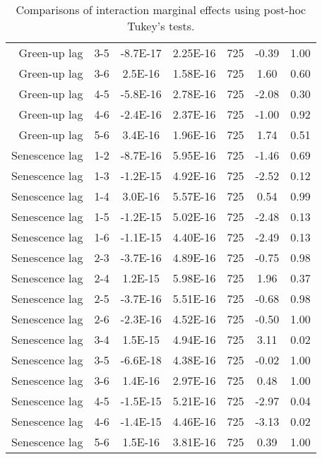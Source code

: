\begin{table}[H]
\begin{tabular}{rcccccc}
  Green-up lag & 3-5 & -8.7E-17 & 2.25E-16 & 725 & -0.39 & 1.00 \\ 
  Green-up lag & 3-6 & 2.5E-16 & 1.58E-16 & 725 & 1.60 & 0.60 \\ 
  Green-up lag & 4-5 & -5.8E-16 & 2.78E-16 & 725 & -2.08 & 0.30 \\ 
  Green-up lag & 4-6 & -2.4E-16 & 2.37E-16 & 725 & -1.00 & 0.92 \\ 
  Green-up lag & 5-6 & 3.4E-16 & 1.96E-16 & 725 & 1.74 & 0.51 \\ 
  Senescence lag & 1-2 & -8.7E-16 & 5.95E-16 & 725 & -1.46 & 0.69 \\ 
  Senescence lag & 1-3 & -1.2E-15 & 4.92E-16 & 725 & -2.52 & 0.12 \\ 
  Senescence lag & 1-4 & 3.0E-16 & 5.57E-16 & 725 & 0.54 & 0.99 \\ 
  Senescence lag & 1-5 & -1.2E-15 & 5.02E-16 & 725 & -2.48 & 0.13 \\ 
  Senescence lag & 1-6 & -1.1E-15 & 4.40E-16 & 725 & -2.49 & 0.13 \\ 
  Senescence lag & 2-3 & -3.7E-16 & 4.89E-16 & 725 & -0.75 & 0.98 \\ 
  Senescence lag & 2-4 & 1.2E-15 & 5.98E-16 & 725 & 1.96 & 0.37 \\ 
  Senescence lag & 2-5 & -3.7E-16 & 5.51E-16 & 725 & -0.68 & 0.98 \\ 
  Senescence lag & 2-6 & -2.3E-16 & 4.52E-16 & 725 & -0.50 & 1.00 \\ 
  Senescence lag & 3-4 & 1.5E-15 & 4.94E-16 & 725 & 3.11 & 0.02 \\ 
  Senescence lag & 3-5 & -6.6E-18 & 4.38E-16 & 725 & -0.02 & 1.00 \\ 
  Senescence lag & 3-6 & 1.4E-16 & 2.97E-16 & 725 & 0.48 & 1.00 \\ 
  Senescence lag & 4-5 & -1.5E-15 & 5.21E-16 & 725 & -2.97 & 0.04 \\ 
  Senescence lag & 4-6 & -1.4E-15 & 4.46E-16 & 725 & -3.13 & 0.02 \\ 
  Senescence lag & 5-6 & 1.5E-16 & 3.81E-16 & 725 & 0.39 & 1.00 \\ 
  \end{tabular}
\caption{Comparisons of interaction marginal effects using post-hoc Tukey's tests.} 
\label{lsq_terms}
\end{table}

